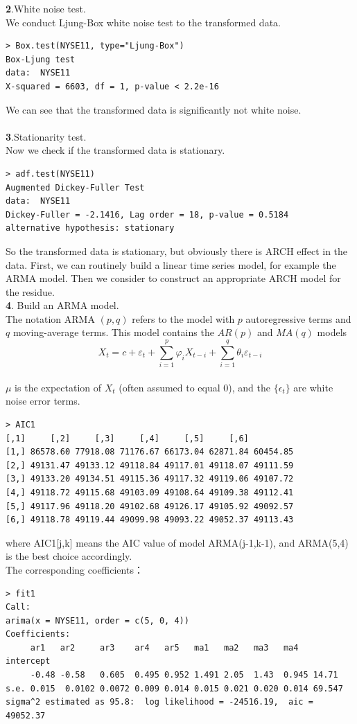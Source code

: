 \documentclass[twoside,11pt]{article}
\begin{document}
\noindent \textbf{2}.White noise test.\\ 
We conduct Ljung-Box white noise test to the transformed data.

\begin{verbatim}
> Box.test(NYSE11, type="Ljung-Box")
Box-Ljung test
data:  NYSE11
X-squared = 6603, df = 1, p-value < 2.2e-16
\end{verbatim}

\noindent We can see that the transformed data is significantly not white noise.\\
\\
\noindent \textbf{3}.Stationarity test.\\
Now we check if the transformed data is stationary.

\begin{verbatim}
> adf.test(NYSE11)
Augmented Dickey-Fuller Test
data:  NYSE11
Dickey-Fuller = -2.1416, Lag order = 18, p-value = 0.5184
alternative hypothesis: stationary
\end{verbatim}

So the transformed data is stationary, but obviously there is ARCH effect in the data. First, we can routinely build a linear time series model, for example the ARMA model. Then we consider to construct an appropriate ARCH model for the residue.\\

\noindent \textbf{4}. Build an ARMA model.\\
The notation ARMA $(p, q)$ refers to the model with $p$ autoregressive terms and $q$ moving-average terms. This model contains the $A R(p)$ and $M A(q)$ models
\[
X_{t}=c+\varepsilon_{t}+\sum_{i=1}^{p} \varphi_{i} X_{t-i}+\sum_{i=1}^{q} \theta_{i} \varepsilon_{t-i}
\]\\
$\mu$ is the expectation of $X_{t}$ (often assumed to equal 0), and the $\{\epsilon_t\}$ are white noise error terms.

\begin{verbatim}
> AIC1
[,1]     [,2]     [,3]     [,4]     [,5]     [,6]
[1,] 86578.60 77918.08 71176.67 66173.04 62871.84 60454.85
[2,] 49131.47 49133.12 49118.84 49117.01 49118.07 49111.59
[3,] 49133.20 49134.51 49115.36 49117.32 49119.06 49107.72
[4,] 49118.72 49115.68 49103.09 49108.64 49109.38 49112.41
[5,] 49117.96 49118.20 49102.68 49126.17 49105.92 49092.57
[6,] 49118.78 49119.44 49099.98 49093.22 49052.37 49113.43
\end{verbatim}
\noindent where AIC1[j,k] means the AIC value of model ARMA(j-1,k-1), and ARMA(5,4) is the best choice accordingly.\\
The corresponding coefficients：
\begin{verbatim}
> fit1
Call:
arima(x = NYSE11, order = c(5, 0, 4))
Coefficients:
     ar1   ar2     ar3    ar4   ar5   ma1   ma2   ma3   ma4   intercept
     -0.48 -0.58   0.605  0.495 0.952 1.491 2.05  1.43  0.945 14.71
s.e. 0.015  0.0102 0.0072 0.009 0.014 0.015 0.021 0.020 0.014 69.547
sigma^2 estimated as 95.8:  log likelihood = -24516.19,  aic = 49052.37
\end{verbatim}
\end{document}
